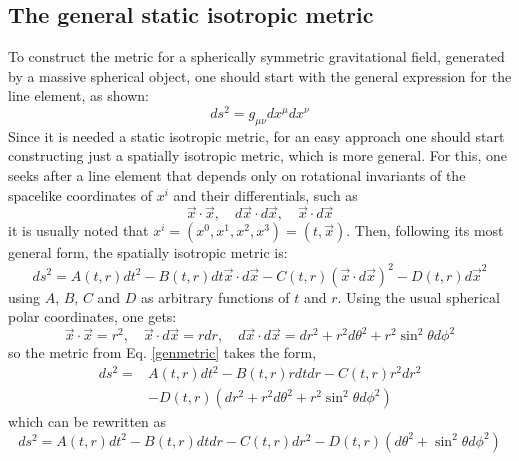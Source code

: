\documentclass[letterpaper,11pt,onecolumn]{article}
\begin{document}
\subsection{The general static isotropic metric}
To construct the metric for a spherically symmetric gravitational field, generated by a massive spherical object, one should start with the general expression for the line element, as shown:
\begin{equation}
d s^{2}=g_{\mu \nu} d x^{\mu} d x^{\nu}\label{lineelement}
\end{equation}
Since it is needed a static isotropic metric, for an easy approach one should start constructing just a spatially isotropic metric, which is more general. For this, one seeks after a line element that depends only on rotational invariants of the spacelike coordinates of $x^i$ and their differentials, such as
\begin{equation}
\vec{x} \cdot \vec{x}, \quad d \vec{x} \cdot d \vec{x}, \quad \vec{x} \cdot d \vec{x}\nonumber
\end{equation}
it is usually noted that $x^i=(x^0,x^1,x^2,x^3)=(t,\vec{x})$. Then, following its most general form, the spatially isotropic metric is:
\begin{equation}
d s^{2}=A(t, r) d t^{2}-B(t, r) d t \vec{x} \cdot d \vec{x}-C(t, r)(\vec{x} \cdot d \vec{x})^{2}-D(t, r) d \vec{x}^{2}
\label{genmetric}
\end{equation}
using $A$, $B$, $C$ and $D$ as arbitrary functions of $t$ and $r$. Using the usual spherical polar coordinates, one gets:
\begin{equation}
\vec{x} \cdot \vec{x}=r^{2}, \quad \vec{x} \cdot d \vec{x}=r d r, \quad d \vec{x} \cdot d \vec{x}=d r^{2}+r^{2} d \theta^{2}+r^{2} \sin ^{2} \theta d \phi^{2} \nonumber
\end{equation}
so the metric from Eq. \ref{genmetric} takes the form,
\begin{equation}
\begin{aligned}
d s^{2}=& A(t, r) d t^{2}-B(t, r) r d t d r-C(t, r) r^{2} d r^{2} \\
&-D(t, r)\left(d r^{2}+r^{2} d \theta^{2}+r^{2} \sin ^{2} \theta d \phi^{2}\right)
\end{aligned}\nonumber
\end{equation}
which can be rewritten as 
\begin{equation}
d s^{2}=A(t, r) d t^{2}-B(t, r) d t d r-C(t, r) d r^{2}-D(t, r)\left(d \theta^{2}+\sin ^{2} \theta d \phi^{2}\right)
\label{genmet2}
\end{equation}
\end{document}

